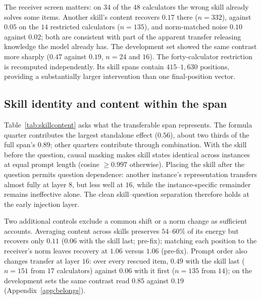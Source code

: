 \documentclass{article}
\begin{document}
The receiver screen matters: on $34$ of the $48$ calculators the wrong skill
already solves some items. Another skill's content recovers $0.17$ there
($n=332$), against $0.05$ on the $14$ restricted calculators ($n=135$), and
norm-matched noise $0.10$ against $0.02$; both are consistent with part of the
apparent transfer releasing knowledge the model already has. The development
set showed the same contrast more sharply ($0.47$ against $0.19$, $n=24$ and
$16$). The forty-calculator restriction is recomputed independently. Its skill
spans contain $415$--$1{,}630$ positions, providing a substantially larger
intervention than one final-position vector.

\subsection{Skill identity and content within the span}
\label{sec:whose}

Table~\ref{tab:skillcontent} asks what the transferable span represents. The
formula quarter contributes the largest standalone effect ($0.56$), about two
thirds of the full span's $0.89$; other quarters contribute through combination.
With the skill before the question, causal masking makes skill states identical
across instances at equal prompt length (cosine $\ge0.997$ otherwise). Placing
the skill after the question permits question dependence: another instance's
representation transfers almost fully at layer $8$, but less well at $16$,
while the instance-specific remainder remains ineffective alone. The clean
skill--question separation therefore holds at the early injection layer.

\begin{table}[t]
\caption{What the span content carries, Qwen3-8B after the instrument fix.
Top: each contiguous quarter is injected separately, on $135$ items from $14$
calculators. Bottom: with the skill after the question, content shared across
other instances and the instance-specific remainder are injected separately,
on $151$ items from $17$ calculators. Both halves are the full-dataset rerun. All entries are recovery $\rho$.}
\label{tab:skillcontent}
\centering\small

\end{table}

Two additional controls exclude a common shift or a norm change as sufficient
accounts. Averaging content across skills preserves $54$--$60\%$ of its energy
but recovers only $0.11$ ($0.06$ with the skill last; pre-fix); matching each
position to the receiver's norm leaves recovery at $1.06$ versus $1.06$
(pre-fix). Prompt order also changes transfer at layer $16$: over every rescued
item, $0.49$ with the skill last ($n=151$ from $17$ calculators) against $0.06$
with it first ($n=135$ from $14$); on the development sets the same contrast read
$0.85$ against $0.19$ (Appendix~\ref{app:belongs}).
\end{document}

